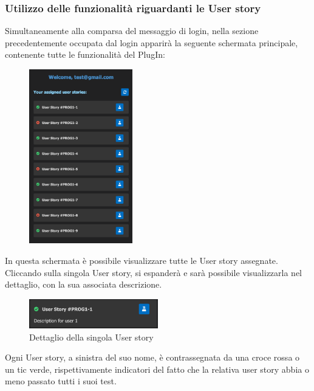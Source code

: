 \documentclass{article}
\begin{document}
    \subsubsection{Utilizzo delle funzionalità riguardanti le User story}
Simultaneamente alla comparsa del messaggio di login, nella sezione precedentemente occupata dal login apparirà la seguente schermata principale, contenente tutte le funzionalità del PlugIn:
    \begin{figure}[H]
      \centering
      \includegraphics[width=0.4\textwidth]{documenti/Screenshot manuale utente/vista_user_story.png}
      \caption{}
      \label{}
    \end{figure}
In questa schermata è possibile visualizzare tutte le User story assegnate. Cliccando sulla singola User story, si espanderà e sarà possibile visualizzarla nel dettaglio, con la sua associata descrizione.
    \begin{figure}[H]
      \centering
      \includegraphics[width=0.5\textwidth]{documenti/Screenshot manuale utente/dettaglio_user_story.png}
      \caption{Dettaglio della singola User story}
      \label{usdett}
    \end{figure}
Ogni User story, a sinistra del suo nome, è contrassegnata da una croce rossa o un tic verde, rispettivamente indicatori del fatto che la relativa user story abbia o meno passato tutti i suoi test.\\
\end{document}
